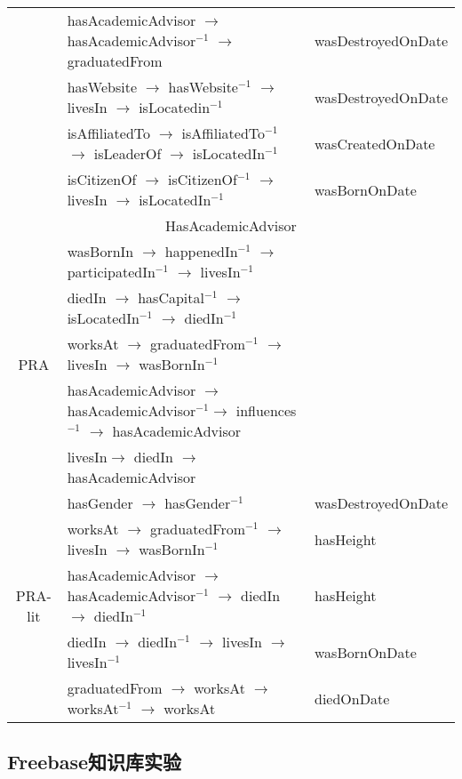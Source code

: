 \begin{table}[htbp]
\begin{tabular}{cp{12.3cm}|p{3.7cm}|}
          & hasAcademicAdvisor $\to$ hasAcademicAdvisor$^{-1}$ $\to$ graduatedFrom &wasDestroyedOnDate \\
          & hasWebsite $\to$ hasWebsite$^{-1}$ $\to$ livesIn $\to$ isLocatedin$^{-1}$ & wasDestroyedOnDate\\
          & isAffiliatedTo $\to$ isAffiliatedTo$^{-1}$ $\to$ isLeaderOf $\to$ isLocatedIn$^{-1}$ & wasCreatedOnDate \\
          & isCitizenOf $\to$ isCitizenOf$^{-1}$ $\to$ livesIn $\to$ isLocatedIn$^{-1}$ & wasBornOnDate \\
    \hline
    \multicolumn{3}{c}{HasAcademicAdvisor} \\
    \hline
    \multirow{5}[2]{*}{PRA} & wasBornIn $\to$ happenedIn$^{-1}$ $\to$ participatedIn$^{-1}$ $\to$ livesIn$^{-1}$ &  \\
          & diedIn $\to$ hasCapital$^{-1}$ $\to$ isLocatedIn$^{-1}$ $\to$ diedIn$^{-1}$ &  \\
          & worksAt $\to$ graduatedFrom$^{-1}$ $\to$ livesIn $\to$ wasBornIn$^{-1}$ &  \\
          & hasAcademicAdvisor $\to$ hasAcademicAdvisor$^{-1}$$\to$ influences$^{-1}$ $\to$ hasAcademicAdvisor &  \\
          & livesIn$\to$ diedIn $\to$ hasAcademicAdvisor &  \\
    \hline
    \multirow{5}[2]{*}{PRA-lit} & hasGender $\to$ hasGender$^{-1}$ & wasDestroyedOnDate \\
          & worksAt $\to$ graduatedFrom$^{-1}$ $\to$ livesIn $\to$ wasBornIn$^{-1}$ & hasHeight \\
          & hasAcademicAdvisor $\to$ hasAcademicAdvisor$^{-1}$ $\to$ diedIn $\to$ diedIn$^{-1}$ & hasHeight \\
          & diedIn $\to$ diedIn$^{-1}$ $\to$ livesIn $\to$ livesIn$^{-1}$ & wasBornOnDate \\
          & graduatedFrom $\to$ worksAt $\to$ worksAt$^{-1}$ $\to$ worksAt  & diedOnDate \\
    \hline
    \hline
    \end{tabular}%
  \label{tab:lit-rel-kbc}%
\end{table}%


\subsection{Freebase知识库实验}

